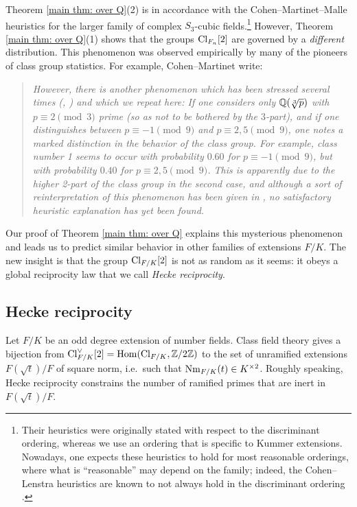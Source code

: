 \documentclass[11pt,a4paper]{amsart}
\def\Z{{\rm \mathbb{Z}}}
\def\Q{{\rm \mathbb{Q}}}
\def\Nm{{\rm Nm}}
\def\Cl{{\rm Cl}}
\def\Hom{{\rm Hom}}
\numberwithin{equation}{section}
\begin{document}
Theorem \ref{main thm: over Q}(2) is in accordance with the Cohen--Martinet--Malle heuristics \cite{Malle2010} for the larger family of complex $S_3$-cubic fields.\footnote{Their heuristics were originally stated with respect to the discriminant ordering, whereas we use an ordering that is specific to Kummer extensions.  Nowadays, one expects these heuristics to hold for most reasonable orderings, where what is  ``reasonable'' may depend on the family; indeed, the Cohen--Lenstra heuristics are known to not always hold in the discriminant ordering \cite{BartelJohnstonLenstra}. 
}
However, Theorem \ref{main thm: over Q}(1) shows that the groups $\Cl_{F_n}[2]$ are governed by a {\it different} distribution.  This phenomenon was observed empirically by many of the pioneers of class group statistics. For example, Cohen--Martinet \cite{CohenMartinet87} write:
\blockquote{\em However, there is another phenomenon which has been stressed several times
 (\cite{ShanksWilliams}, \cite{TennenhouseWilliams}) and which we repeat here: If one considers only $\Q(\sqrt[3]{p})$ with $p\equiv 2\pmod 3$ prime (so as not to be bothered by the $3$-part), and if one distinguishes
 between $p\equiv -1 \pmod9$ and $p\equiv 2, 5 \pmod 9$, one notes a marked distinction in the
 behavior of the class group. For example, class number 1 seems to occur with
 probability $0.60$ for $p \equiv -1 \pmod9$, but with probability $0.40$ for $p \equiv 2, 5 \pmod9$. This is apparently due to the higher 2-part of the class group in the second case, and
 although a sort of reinterpretation of this phenomenon has been given in \cite{EisenbeisFreyOmmerbon}, no
 satisfactory heuristic explanation has yet been found.}

Our proof of Theorem \ref{main thm: over Q} explains this mysterious phenomenon and leads us to predict similar behavior in other families of extensions $F/K$.  The new insight is that the group $\Cl_{F/K}[2]$ is not as random as it seems: it obeys a global reciprocity law that we call \textit{Hecke reciprocity}.   




\subsection{Hecke reciprocity}

Let $F/K$ be an odd degree extension of number fields. Class field theory gives a bijection from $\Cl_{F/K}^\vee[2] = \Hom(\Cl_{F/K},\Z/2\Z)$ to the set of unramified extensions $F(\sqrt{t})/F$ of square norm, i.e.\ such that $\Nm_{F/K}(t) \in K^{\times2}$. Roughly speaking, Hecke reciprocity constrains the number of ramified primes that are inert in $F(\sqrt{t})/F$.  
\end{document}

